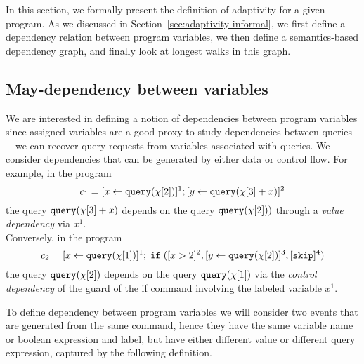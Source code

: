 In this section, we formally present the definition of adaptivity for a given program.
As we discussed in Section~\ref{sec:adaptivity-informal}, we first define a dependency relation between program variables,
we then define a semantics-based dependency graph, and finally look at longest walks in this graph. 
\subsection{May-dependency between variables}
\label{sec:dep}
We are interested in defining a notion of dependencies between program variables since assigned variables are a good proxy to study dependencies between queries---we can recover query requests from variables associated with queries. We consider dependencies that can be generated by either data or control flow.
For example, in the program 
\[c_1 =[\mathrel{ x \leftarrow {\tt query}(\chi[2]) }]^1 ;[\mathrel{ y \leftarrow {\tt query}(\chi[3] + x) }]^2\]
the query ${\tt query}(\chi[3] + x)$  depends on the query ${\tt query}(\chi[2]))$ through a \emph{value dependency} via  $x^1$.
\\
Conversely, in the program
\[c_2 = [\mathrel{ x \leftarrow {\tt query}(\chi[1]) }]^1 ; \;\mathtt{if}\;( [x > 2]^2 , [\mathrel{ y \leftarrow {\tt query}(\chi[2]) }]^3, [\mathtt{skip}]^4 )\] 
the query ${\tt query}(\chi[2])$ 
depends on the query ${\tt query}(\chi[1])$ via the \emph{control dependency} of the guard of the if command involving the labeled variable $x^1$.

To define dependency between program variables we will consider two events that are generated from the same command, hence they have the same variable name or boolean expression and label, but have either different value or different query expression, captured by the following definition. 


